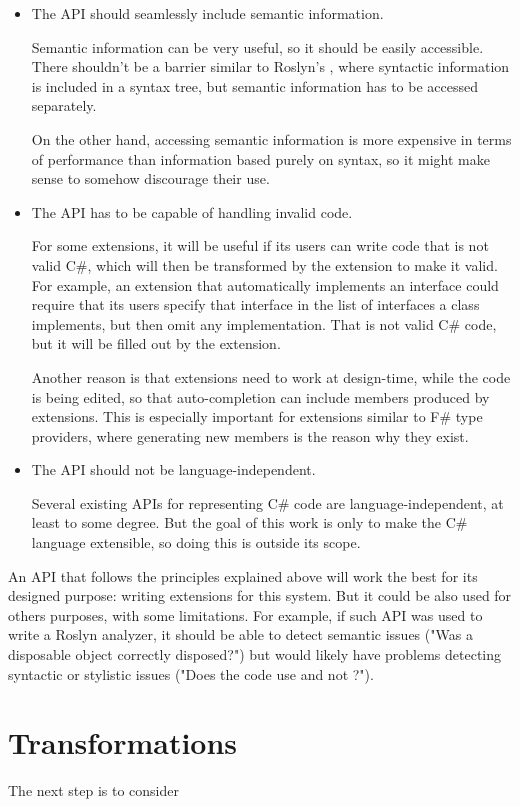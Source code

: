 \begin{itemize}
\item The \ac{API} should seamlessly include semantic information.

Semantic information can be very useful, so it should be easily accessible. There shouldn't be a barrier similar to Roslyn's , where syntactic information is included in a syntax tree, but semantic information has to be accessed separately.

On the other hand, accessing semantic information is more expensive in terms of performance than information based purely on syntax, so it might make sense to somehow discourage their use.

\item The \ac{API} has to be capable of handling invalid code.

For some extensions, it will be useful if its users can write code that is not valid C\#, which will then be transformed by the extension to make it valid. For example, an extension that automatically implements an interface could require that its users specify that interface in the list of interfaces a class implements, but then omit any implementation. That is not valid C\# code, but it will be filled out by the extension.

Another reason is that extensions need to work at design-time, while the code is being edited, so that auto-completion can include members produced by extensions. This is especially important for extensions similar to F\# type providers, where generating new members is the reason why they exist.

\item The \ac{API} should not be language-independent.

\nopagebreak

Several existing \acp{API} for representing C\# code are language-independent, at least to some degree. But the goal of this work is only to make the C\# language extensible, so doing this is outside its scope.

\end{itemize}

An \ac{API} that follows the principles explained above will work the best for its designed purpose: writing extensions for this system. But it could be also used for others purposes, with some limitations. For example, if such \ac{API} was used to write a Roslyn analyzer, it should be able to detect semantic issues ("Was a disposable object correctly disposed?") but would likely have problems detecting syntactic or stylistic issues ("Does the code use  and not ?").

\section{Transformations}

The next step is to consider 
